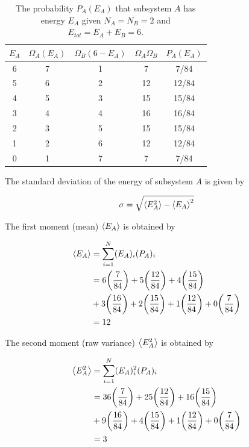 \documentclass[9pt,a4paper,twocolumn]{article}
\begin{document}
\begin{table}[h!]
	\centering
	\begin{tabular}{|c|c||c|c|c|}
		\hline
		$E_A$ & $\Omega_A(E_A)$ & $\Omega_B(6-E_A)$ & $\Omega_A\Omega_B$ & $P_A(E_A)$ \\ \hline
		6 & 7 & 1 & 7 & 7/84 \\ \hline
		5 & 6 & 2 & 12 & 12/84 \\ \hline
		4 & 5 & 3 & 15 & 15/84 \\ \hline
		3 & 4 & 4 & 16 & 16/84 \\ \hline
		2 & 3 & 5 & 15 & 15/84 \\ \hline
		1 & 2 & 6 & 12 & 12/84 \\ \hline
		0 & 1 & 7 & 7 & 7/84 \\ \hline
	\end{tabular}
	\caption{The probability $P_A(E_A)$ that subsystem $A$ has energy $E_A$ given $N_A = N_B = 2$ and $E_{tot} = E_A + E_B = 6$.}
	\label{tab:4.5-given}
\end{table}

The standard deviation of the energy of subsystem $A$ is given by

\begin{equation}
	\sigma = \sqrt{\ev{E_A^2} - \ev{E_A}^2} \label{eq:sd}
\end{equation}

The first moment (mean) $\ev{E_A}$ is obtained by

\begin{align}
	\ev{E_A} &= \sum_{i=1}^N (E_A)_i (P_A)_i \label{eq:mean} \\
	&= 6\qty(\frac{7}{84}) + 5\qty(\frac{12}{84}) + 4\qty(\frac{15}{84}) \nonumber \\
	&+ 3\qty(\frac{16}{84}) + 2\qty(\frac{15}{84}) + 1\qty(\frac{12}{84}) + 0\qty(\frac{7}{84}) \nonumber \\
	&= 12 \nonumber
\end{align}

The second moment (raw variance) $\ev{E_A^2}$ is obtained by

\begin{align}
	\ev{E_A^2} &= \sum_{i=1}^N (E_A)_i^2 (P_A)_i \label{eq:var} \\
	&= 36\qty(\frac{7}{84}) + 25\qty(\frac{12}{84}) + 16\qty(\frac{15}{84}) \nonumber \\
	&+ 9\qty(\frac{16}{84}) + 4\qty(\frac{15}{84}) + 1\qty(\frac{12}{84}) + 0\qty(\frac{7}{84}) \nonumber \\
	&= 3 \nonumber
\end{align}
\end{document}

